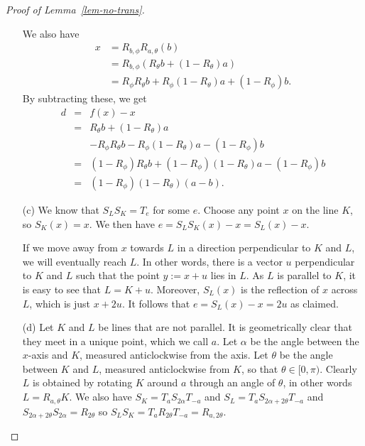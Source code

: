 \documentclass{amsart}
\newcommand{\blob}      {circle(0.03cm)}
\newcommand{\al}        {\alpha}
\newcommand{\tht}       {\theta}
\renewcommand{\:}{\colon}
\theoremstyle{definition}
\begin{document}
\begin{proof}[Proof of Lemma~\ref{lem-no-trans}]
\begin{itemize}
   We also have 
   \begin{align*}
    x &= R_{b,\phi}R_{a,\tht}(b) \\
      &= R_{b,\phi}(R_\tht b + (1-R_\tht)a) \\
      &= R_\phi R_\tht b + R_\phi(1-R_\tht)a + (1-R_\phi)b.
   \end{align*}
   By subtracting these, we get
   \begin{eqnarray*}
    d & = & f(x) - x \\
      & = & R_\tht b + (1-R_\tht)a \\
      &   & - R_\phi R_\tht b - R_\phi(1-R_\tht)a - (1-R_\phi)b \\
      & = & (1-R_\phi)R_\tht b + (1-R_\phi)(1-R_\tht)a - (1-R_\phi)b \\
      & = & (1-R_\phi)(1-R_\tht)(a-b).
   \end{eqnarray*}
  \item[(c)]
   We know that $S_LS_K=T_e$ for some $e$. 
   Choose any point $x$ on the line $K$, so $S_K(x)=x$.  We then have
   $e=S_LS_K(x)-x=S_L(x)-x$.
   
   If we move away from $x$ towards $L$ in a direction perpendicular
   to $K$ and $L$, we will eventually reach $L$.  In other words,
   there is a vector $u$ perpendicular to $K$ and $L$ such that the
   point $y:=x+u$ lies in $L$.  As $L$ is parallel to $K$, it is easy
   to see that $L=K+u$.  Moreover, $S_L(x)$ is the reflection of $x$
   across $L$, which is just $x+2u$.  It follows that $e=S_L(x)-x=2u$
   as claimed.
   \begin{center}
   \end{center}
  \item[(d)] Let $K$ and $L$ be lines that are not parallel.  It is
   geometrically clear that they meet in a unique point, which we call
   $a$.  Let $\al$ be the angle between the $x$-axis and $K$, measured
   anticlockwise from the axis.  Let $\theta$ be the angle between $K$
   and $L$, measured anticlockwise from $K$, so that $\theta\in[0,\pi)$.
   Clearly $L$ is obtained by rotating $K$ around $a$ through an angle
   of $\theta$, in other words $L=R_{a,\theta}K$.  We also have
   $S_K=T_aS_{2\al}T_{-a}$ and $S_L=T_aS_{2\al+2\theta}T_{-a}$ and
   $S_{2\al+2\theta}S_{2\al}=R_{2\theta}$ so
   $S_LS_K=T_aR_{2\theta}T_{-a}=R_{a,2\theta}$.
 \end{itemize}
\end{proof}
\end{document}
